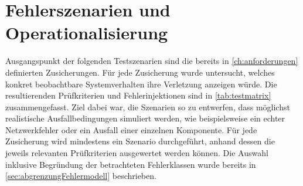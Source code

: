 \section{Fehlerszenarien und Operationalisierung}
\label{sec:fehlerszenarien}
Ausgangspunkt der folgenden Testszenarien sind die bereits in \cref{ch:anforderungen} definierten Zusicherungen.
Für jede Zusicherung wurde untersucht, welches konkret beobachtbare Systemverhalten ihre Verletzung anzeigen würde.
Die resultierenden Prüfkriterien und Fehlerinjektionen sind in \cref{tab:testmatrix} zusammengefasst.
Ziel dabei war, die Szenarien so zu entwerfen, dass möglichst realistische Ausfallbedingungen simuliert werden, wie
beispielsweise ein echter Netzwerkfehler oder ein Ausfall einer einzelnen Komponente.
Für jede Zusicherung wird mindestens ein Szenario durchgeführt, anhand dessen die jeweils relevanten Prüfkriterien
ausgewertet werden können.
Die Auswahl inklusive Begründung der betrachteten Fehlerklassen wurde bereits in \cref{sec:abgrenzungFehlermodell} beschrieben.

